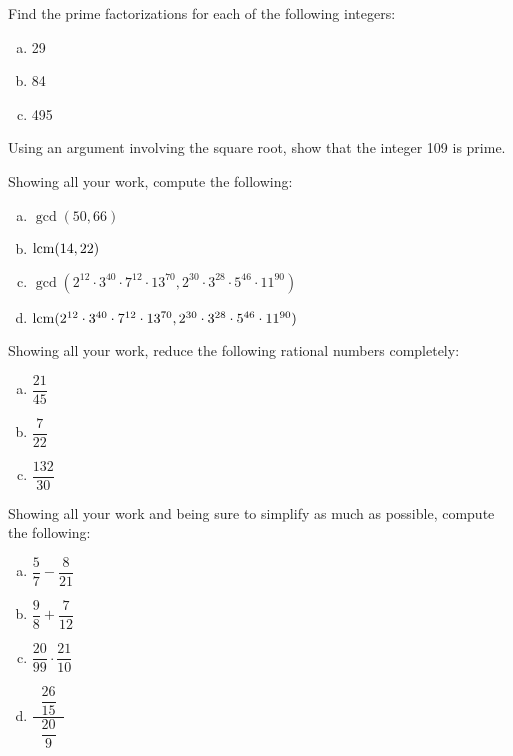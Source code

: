 \documentclass[12pt,letterpaper]{exam}
\begin{document}
\begin{questions}
\newpage
\question[10] Find the prime factorizations for each of the following integers:
        \begin{enumerate}[(a)]
        \item 29
        \item 84
        \item 495
        \end{enumerate}



\newpage
\question[10] Using an argument involving the square root, show that the integer 109 is prime. 



\newpage
\question[10] Showing all your work, compute the following:
	\begin{enumerate}[(a)]
	\item $\gcd(50, 66)$
	\item $\operatorname{lcm}(14, 22)$
	\item $\gcd(2^{12} \cdot 3^{40} \cdot 7^{12} \cdot 13^{70}, 2^{30} \cdot 3^{28} \cdot 5^{46} \cdot 11^{90})$
	\item $\operatorname{lcm}(2^{12} \cdot 3^{40} \cdot 7^{12} \cdot 13^{70}, 2^{30} \cdot 3^{28} \cdot 5^{46} \cdot 11^{90})$
	\end{enumerate}



\newpage
\question[10] Showing all your work, reduce the following rational numbers completely:
	\begin{enumerate}[(a)]
	\item $\dfrac{21}{45}$
	\item $\dfrac{7}{22}$
	\item $\dfrac{132}{30}$
	\end{enumerate}



\newpage
\question[10] Showing all your work and being sure to simplify as much as possible, compute the following:
	\begin{enumerate}[(a)] \itemsep=0.3cm
	\item $\dfrac{5}{7} - \dfrac{8}{21}$
	\item $\dfrac{9}{8} + \dfrac{7}{12}$
	\item $\dfrac{20}{99} \cdot \dfrac{21}{10}$
	\item $\dfrac{\;\;\dfrac{26}{15}\;\;}{\;\;\dfrac{20}{9}\;\;}$
	\end{enumerate}




\end{questions}
\end{document}
